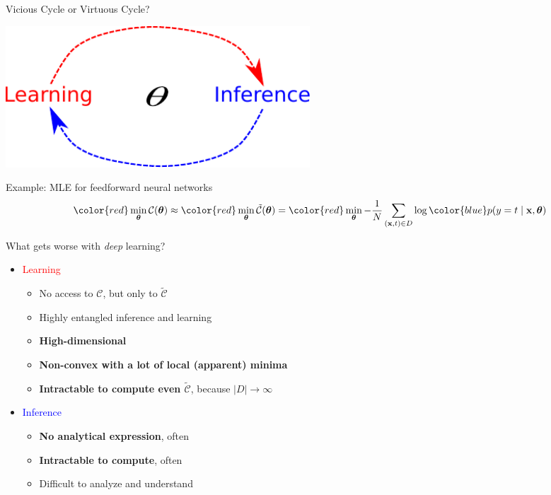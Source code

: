 \documentclass{beamer}
\newcommand{\vect}[1]{\mathbf{#1}}
\newcommand{\vects}[1]{\boldsymbol{#1}}
\newcommand{\vx}[0]{\vect{x}}
\newcommand{\TT}[0]{{\vects{\theta}}}
\newcommand{\CC}[0]{\mathcal{C}}
\newcommand{\tred}[1]{\textcolor{red}{#1}}
\newcommand{\tblue}[1]{\textcolor{blue}{#1}}
\begin{document}
\begin{frame}{Vicious Cycle or Virtuous Cycle?}

        \centering
        \includegraphics[width=0.5\textwidth]{vicious_cycle.pdf}

    \vfill
    \raggedright
    Example: MLE for feedforward neural networks
    \begin{align*}
        {\color{red} \min_{\TT} \CC(\TT)} \approx 
        {\color{red} \min_{\TT} \tilde{\CC}(\TT)} =
        {\color{red} \min_{\TT} -\frac{1}{N}\sum_{\left(\vx,t\right) \in D}
        \log {\color{blue}p(y=t \mid \vx, \TT)}}
    \end{align*}

\end{frame}

\begin{frame}{What gets worse with \emph{deep} learning?}
    \begin{itemize}
        \item \tred{Learning}
            \begin{itemize}
                \item No access to $\CC$, but only to $\tilde{\CC}$
                \item Highly entangled inference and learning
                \item \textbf{High-dimensional}
                \item \textbf{Non-convex with a lot of local (apparent) minima}
                \item \textbf{Intractable to compute even $\tilde{\CC}$}, because $\left| D \right| \to \infty$
            \end{itemize}
    \end{itemize}

    \begin{itemize}
        \item \tblue{Inference}
            \begin{itemize}
                \item \textbf{No analytical expression}, often
                \item \textbf{Intractable to compute}, often
                \item Difficult to analyze and understand
            \end{itemize}
    \end{itemize}
\end{frame}
\end{document}
